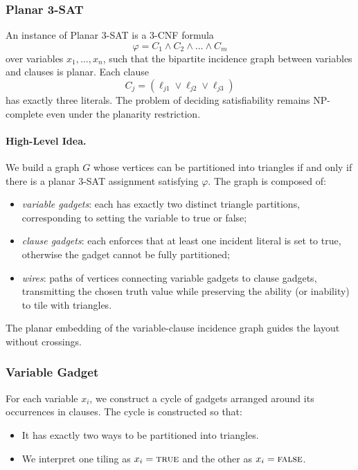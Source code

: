 \documentclass[9pt]{extarticle}
\begin{document}
\subsubsection*{Planar 3-SAT}

An instance of Planar 3-SAT is a 3-CNF formula
\[
    \varphi = C_1 \land C_2 \land \dots \land C_m
\]
over variables $x_1,\dots,x_n$, such that the bipartite incidence graph
between variables and clauses is planar.  Each clause
\[
    C_j = (\ell_{j1} \lor \ell_{j2} \lor \ell_{j3})
\]
has exactly three literals.  The problem of deciding satisfiability remains
NP-complete even under the planarity restriction.

\paragraph{High-Level Idea.}
We build a graph $G$ whose vertices can be partitioned into triangles if and
only if there is a planar 3-SAT assignment satisfying $\varphi$.  The graph is
composed of:
\begin{itemize}
    \item \emph{variable gadgets}: each has exactly two distinct triangle
          partitions, corresponding to setting the variable to true or false;
    \item \emph{clause gadgets}: each enforces that at least one incident
          literal is set to true, otherwise the gadget cannot be fully partitioned;
    \item \emph{wires}: paths of vertices connecting variable gadgets to clause
          gadgets, transmitting the chosen truth value while preserving the
          ability (or inability) to tile with triangles.
\end{itemize}

The planar embedding of the variable-clause incidence graph guides the layout
without crossings.

\subsubsection*{Variable Gadget}

For each variable $x_i$, we construct a cycle of gadgets arranged around its
occurrences in clauses.  The cycle is constructed so that:

\begin{itemize}
    \item It has exactly two ways to be partitioned into triangles.
    \item We interpret one tiling as $x_i = \textsc{true}$ and the other as
          $x_i = \textsc{false}$.
\end{itemize}
\end{document}
